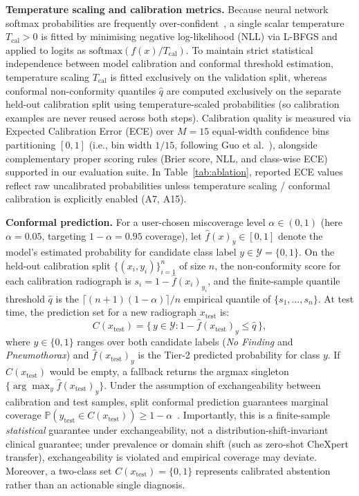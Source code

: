 \documentclass[diagnostics,article,submit,moreauthors]{Definitions/mdpi}
\newcommand{\rev}[1]{#1}
\begin{document}
\textbf{Temperature scaling and calibration metrics.} Because neural network softmax probabilities are frequently over-confident~\cite{guo2017calibration}, a single scalar temperature $T_{\text{cal}} > 0$ is fitted by minimising negative log-likelihood (NLL) via L-BFGS and applied to logits as $\mathrm{softmax}(f(x)/T_{\text{cal}})$. \rev{To maintain strict statistical independence between model calibration and conformal threshold estimation, temperature scaling $T_{\text{cal}}$ is fitted exclusively on the validation split, whereas conformal non-conformity quantiles $\hat{q}$ are computed exclusively on the separate held-out calibration split using temperature-scaled probabilities (so calibration examples are never reused across both steps).} Calibration quality is measured via Expected Calibration Error (ECE) over $M=15$ equal-width confidence bins partitioning $[0,1]$ (i.e., bin width $1/15$, following Guo et al.~\cite{guo2017calibration}), alongside complementary proper scoring rules (Brier score, NLL, and class-wise ECE) supported in our evaluation suite. \rev{In Table~\ref{tab:ablation}, reported ECE values reflect raw uncalibrated probabilities unless temperature scaling / conformal calibration is explicitly enabled (A7, A15).}

\textbf{Conformal prediction.} For a user-chosen miscoverage level $\alpha \in (0,1)$ (here $\alpha=0.05$, targeting $1-\alpha=0.95$ coverage), let $\hat{f}(x)_y \in [0,1]$ denote the model's estimated probability for candidate class label $y \in \mathcal{Y} = \{0, 1\}$. On the held-out calibration split $\{(x_i, y_i)\}_{i=1}^{n}$ of size $n$, the non-conformity score for each calibration radiograph is $s_i = 1 - \hat{f}(x_i)_{y_i}$, and the finite-sample quantile threshold $\hat{q}$ is the $\lceil(n+1)(1-\alpha)\rceil / n$ empirical quantile of $\{s_1,\dots,s_n\}$. At test time, the prediction set for a new radiograph $x_{\text{test}}$ is:
\begin{equation}
C(x_{\text{test}}) = \{\, y \in \mathcal{Y} : 1 - \hat{f}(x_{\text{test}})_y \le \hat{q}\,\},
\label{eq:conformal}
\end{equation}
\rev{where $y \in \{0, 1\}$ ranges over both candidate labels (\emph{No Finding} and \emph{Pneumothorax}) and $\hat{f}(x_{\text{test}})_y$ is the Tier-2 predicted probability for class $y$. If $C(x_{\text{test}})$ would be empty, a fallback returns the argmax singleton $\{\arg\max_y \hat{f}(x_{\text{test}})_y\}$. Under the assumption of exchangeability between calibration and test samples, split conformal prediction guarantees marginal coverage $\mathbb{P}(y_{\text{test}} \in C(x_{\text{test}})) \ge 1 - \alpha$~\cite{vovk2005algorithmic, shafer2008tutorial}. Importantly, this is a finite-sample \emph{statistical} guarantee under exchangeability, not a distribution-shift-invariant clinical guarantee; under prevalence or domain shift (such as zero-shot CheXpert transfer), exchangeability is violated and empirical coverage may deviate. Moreover, a two-class set $C(x_{\text{test}})=\{0,1\}$ represents calibrated abstention rather than an actionable single diagnosis.}
\end{document}
